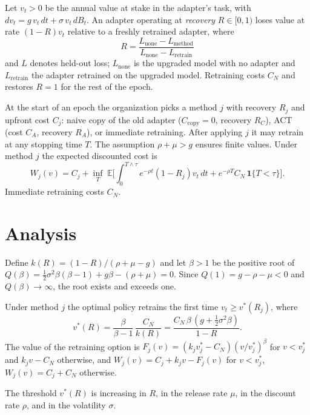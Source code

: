\documentclass[acmsmall,review]{acmart}
\newcommand{\E}{\mathbb{E}}
\begin{document}
Let $v_t>0$ be the annual value at stake in the adapter's task, with
$dv_t = g\,v_t\,dt + \sigma\,v_t\,dB_t$. An adapter operating at \emph{recovery} $R\in[0,1)$ loses value at rate
$(1-R)v_t$ relative to a freshly retrained adapter, where
\begin{equation}
R=\frac{L_{\text{none}}-L_{\text{method}}}{L_{\text{none}}-L_{\text{retrain}}}
\end{equation}
and $L$ denotes held-out loss; $L_{\text{none}}$ is the upgraded model with no adapter and $L_{\text{retrain}}$ the
adapter retrained on the upgraded model. Retraining costs $C_N$ and restores $R=1$ for the rest of the epoch.

At the start of an epoch the organization picks a method $j$ with recovery $R_j$ and upfront cost $C_j$: naive copy
of the old adapter ($C_{\text{copy}}=0$, recovery $R_C$), ACT (cost $C_A$, recovery $R_A$), or immediate retraining.
After applying $j$ it may retrain at any stopping time $T$. The assumption $\rho+\mu>g$ ensures finite values. Under
method $j$ the expected discounted cost is
\begin{equation}
W_j(v)=C_j+\inf_{T}\;\E\Big[\int_0^{T\wedge\tau}e^{-\rho t}(1-R_j)v_t\,dt+e^{-\rho T}C_N\,\mathbf 1\{T<\tau\}\Big].
\end{equation}
Immediate retraining costs $C_N$.

\section{Analysis}\label{sec:analysis}

Define $k(R)=(1-R)/(\rho+\mu-g)$ and let $\beta>1$ be the positive root of
$Q(\beta)=\tfrac12\sigma^2\beta(\beta-1)+g\beta-(\rho+\mu)=0$. Since $Q(1)=g-\rho-\mu<0$ and
$Q(\beta)\to\infty$, the root exists and exceeds one.

\begin{proposition}\label{prop:thr}
Under method $j$ the optimal policy retrains the first time $v_t\ge v^*(R_j)$, where
\begin{equation}
v^*(R)=\frac{\beta}{\beta-1}\,\frac{C_N}{k(R)}=\frac{C_N\,\beta\,(g+\tfrac12\sigma^2\beta)}{1-R}.
\end{equation}
The value of the retraining option is $F_j(v)=(k_jv^*_j-C_N)(v/v^*_j)^\beta$ for $v<v^*_j$ and $k_jv-C_N$ otherwise, and
$W_j(v)=C_j+k_jv-F_j(v)$ for $v<v^*_j$, $W_j(v)=C_j+C_N$ otherwise.
\end{proposition}

\begin{proposition}\label{prop:cs}
The threshold $v^*(R)$ is increasing in $R$, in the release rate $\mu$, in the discount rate $\rho$, and in the
volatility $\sigma$.
\end{proposition}
\end{document}
